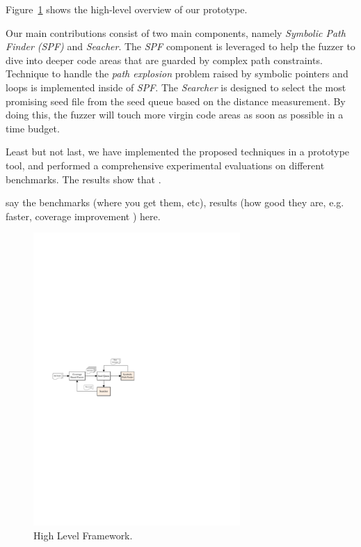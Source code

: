 Figure~\ref{Framework} shows the high-level overview of our prototype.

 {\color{blue}{The following is still a duplication.}}

 Our main contributions consist of two main components, namely \emph{Symbolic Path Finder (SPF)} and \emph{Seacher}. 
 The \emph{SPF} component is leveraged to help the fuzzer to dive into deeper code areas 
 that are guarded by complex path constraints. 
 Technique to handle the \textit{path explosion} problem 
 raised by symbolic pointers and loops is implemented inside of \emph{SPF}. 
 The \emph{Searcher} is designed to select the most promising seed file 
 from the seed queue based on the distance measurement. 
 By doing this, the fuzzer will touch more virgin 
 {\color{blue}{are you sure this is the right word? i guess you mean margin}} 
 code areas as soon as possible in a time budget. 

 Least but not last,  we have implemented the proposed techniques in a prototype tool,
 and performed a comprehensive experimental evaluations on different benchmarks.
 The results show that .

 {\color{blue} say the benchmarks (where you get them, etc), 
 results (how good they are, e.g. faster, coverage improvement ) here. }

\begin{figure}
\begin{center}
\includegraphics[width=0.7\textwidth]{figures/framework.pdf} 
\caption{High Level Framework.}\label{Framework}
\end{center}
\end{figure}


